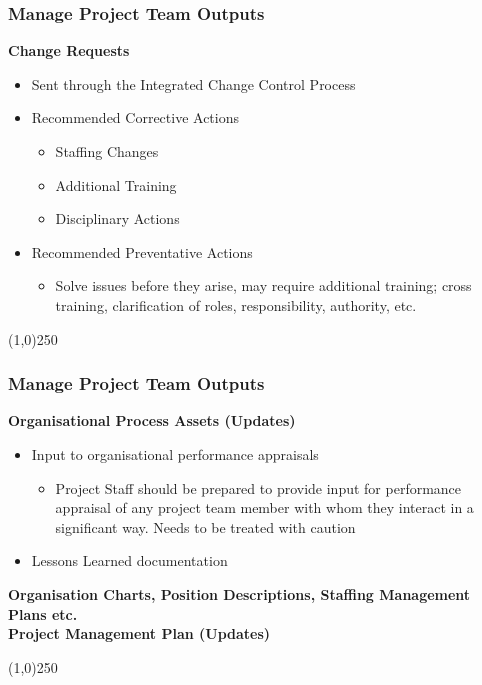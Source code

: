 \begin{frame}
\frametitle{Manage Project Team \hfill Outputs}
\textbf{Change Requests}
\begin{itemize}
	\item Sent through the Integrated Change Control Process
	\item Recommended Corrective Actions
			\begin{itemize}
				\item Staffing Changes\\
				\item Additional Training\\
				\item Disciplinary Actions\\
			\end{itemize}

	\item Recommended Preventative Actions\\
			\begin{itemize}
				\item Solve issues before they arise, may require additional training; cross training, clarification of roles, responsibility, authority, etc.
			\end{itemize}
\end{itemize}			
\end{frame}\begin{center}\line(1,0){250}\end{center}
 
 
\begin{frame}
\frametitle{Manage Project Team \hfill Outputs}
\textbf{Organisational Process Assets (Updates)}\\
\begin{itemize}
	\item Input to organisational performance appraisals
		\begin{itemize}
			\item Project Staff should be prepared to provide input for performance appraisal of any project team member with whom they interact in a significant way.  Needs to be treated with caution
		\end{itemize}
	\item Lessons Learned documentation
\end{itemize}
\textbf{Organisation Charts, Position Descriptions, Staffing Management Plans etc.}\\
\textbf{Project Management Plan (Updates)}\\
\end{frame}\begin{center}\line(1,0){250}\end{center}
 
